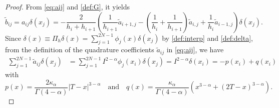 \documentclass{amsart}
\theoremstyle{definition}
\theoremstyle{remark}
\numberwithin{equation}{section}
\begin{document}
\begin{proof}
  From \eqref{eq:aij} and \eqref{def:G}, it yields
  \begin{equation*}
    \tilde{b}_{ij} = a_{ij} \delta(x_j) = -  \frac{2}{h_i + h_{i+1}} \left( \frac{1}{h_{i+1}} \tilde{a}_{i+1,j} - (\frac{1}{h_{i}}+\frac{1}{h_{i+1}})\tilde{a}_{i,j} + \frac{1}{h_{i}} \tilde{a}_{i-1,j}\right) \delta(x_j).
  \end{equation*}
  Since
  \(
    \delta(x) \equiv \Pi_h \delta(x) = \sum_{j=1}^{2N-1} \phi_j(x) \delta(x_j)
  \) by \eqref{def:interp} and \eqref{def:delta},
  from the definition of the quadrature coefficients $\tilde{a}_{ij}$ in \eqref{eq:aij}, we have
  \begin{equation*}
    \begin{aligned}
      \sum_{j=1}^{2N-1} \tilde{a}_{ij} \delta(x_j)
                  & = \sum_{j=1}^{2N-1} I^{2-\alpha} \phi_j(x_i) \delta(x_j) 
                    = I^{2-\alpha} \delta(x_i)
                  =  -p(x_i) + q(x_i)
    \end{aligned}
  \end{equation*}
  with
  \begin{equation*}
      p(x) = \frac{2 \kappa_\alpha}{\Gamma(4-\alpha)}|T-x|^{3-\alpha} \quad \text{and} \quad
      q(x) = \frac{\kappa_\alpha}{\Gamma(4-\alpha)}\left( x^{3-\alpha} + (2T-x)^{3-\alpha} \right).
  \end{equation*}


\end{proof}
\end{document}

